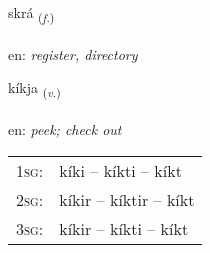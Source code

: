 \documentclass[frontgrid, backgrid]{flacards}\usepackage[]{graphicx}\usepackage[]{xcolor}
\begin{document}
\renewcommand{\flhead}{\vskip5pt \fboxsep=0pt {\small\bfseries\footnotesize Nafnorð | Noun}}
\renewcommand{\fcfoot}{\vskip5pt \fboxsep=0pt \hspace{2pt}{\small\bfseries\footnotesize 3K}}

\renewcommand{\blhead}{\vskip5pt {\small\bfseries\footnotesize Nafnorð | Noun }}
\renewcommand{\bcfoot}{\vskip5pt \hspace{2pt}{\small\bfseries\footnotesize 3K}}


{skrá \small{\textsubscript{(\textit{f.})}} \\[1ex] %
\textphonetic{[skrauː]} \\
en: \emph{register, directory} \\  [2ex]
\renewcommand*{\arraystretch}{0.8}
}

\renewcommand{\flhead}{\vskip5pt \fboxsep=0pt {\small\bfseries\footnotesize Sagnorð | Verb}}
\renewcommand{\fcfoot}{\vskip5pt \fboxsep=0pt \hspace{2pt}{\small\bfseries\footnotesize 3K}}

\renewcommand{\blhead}{\vskip5pt {\small\bfseries\footnotesize Sagnorð | Verb }}
\renewcommand{\bcfoot}{\vskip5pt \hspace{2pt}{\small\bfseries\footnotesize 3K}}


{kíkja \small{\textsubscript{(\textit{v.})}} \\[1ex] %
\textphonetic{[cʰiːca]} \\
en: \emph{peek; check out} \\  [2ex]
\renewcommand*{\arraystretch}{0.8}
\begin{tabular}{p{1cm}l}
\textsc{1sg}: & kíki -- kíkti -- kíkt \\ 
\textsc{2sg}: & kíkir -- kíktir -- kíkt \\ 
\textsc{3sg}: & kíkir -- kíkti -- kíkt \\ 
\end{tabular}
}
\end{document}
